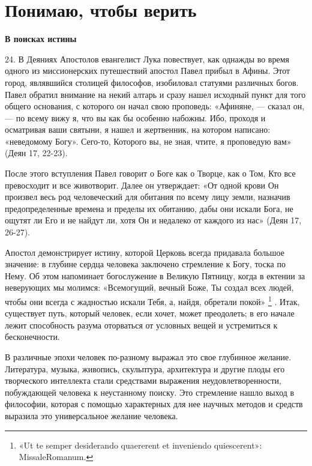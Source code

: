 \documentclass[a5paper,10pt]{article}
\begin{document}
\section{Понимаю, чтобы верить}

\textbf{В поисках истины}

24. В Деяниях Апостолов евангелист Лука повествует, как однажды во время одного
из миссионерских путешествий апостол Павел прибыл в Афины. Этот город,
являвшийся столицей философов, изобиловал статуями различных богов. Павел
обратил внимание на некий алтарь и сразу нашел исходный пункт для того общего
основания, с которого он начал свою проповедь: «Афиняне, — сказал он, — по
всему вижу я, что вы как бы особенно набожны. Ибо, проходя и осматривая ваши
святыни, я нашел и жертвенник, на котором написано: «неведомому Богу». Сего-то,
Которого вы, не зная, чтите, я проповедую вам» (Деян 17, 22-23).

После этого вступления Павел говорит о Боге как о Творце, как о Том, Кто все
превосходит и все животворит. Далее он утверждает: «От одной крови Он произвел
весь род человеческий для обитания по всему лицу земли, назначив
предопределенные времена и пределы их обитанию, дабы они искали Бога, не ощутят
ли Его и не найдут ли, хотя Он и недалеко от каждого из нас» (Деян 17, 26-27).

Апостол демонстрирует истину, которой Церковь всегда придавала большое
значение: в глубине сердца человека заключено стремление к Богу, тоска по Нему.
Об этом напоминает богослужение в Великую Пятницу, когда в ектении за
неверующих мы молимся: «Всемогущий, вечный Боже, Ты создал всех людей, чтобы
они всегда с жадностью искали Тебя, а, найдя, обретали покой» \footnote{«Ut te
semper desiderando quaererent et inveniendo quiescerent»: MissaleRomanum.} .
Итак, существует путь, который человек, если хочет, может преодолеть; в его
начале лежит способность разума оторваться от условных вещей и устремиться к
бесконечности.

В различные эпохи человек по-разному выражал это свое глубинное желание.
Литература, музыка, живопись, скульптура, архитектура и другие плоды его
творческого интеллекта стали средствами выражения неудовлетворенности,
побуждающей человека к неустанному поиску. Это стремление нашло выход в
философии, которая с помощью характерных для нее научных методов и средств
выразила это универсальное желание человека.
\end{document}
